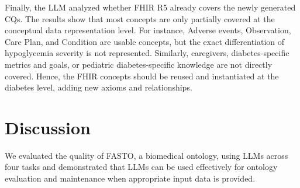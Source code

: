 \documentclass[
]{ceurart}
\begin{document}
Finally, the LLM analyzed whether FHIR R5 already covers the newly generated CQs. The results show that most concepts are only partially covered at the conceptual data representation level. For instance, Adverse events, Observation, Care Plan, and Condition are usable concepts, but the exact differentiation of hypoglycemia severity is not represented. Similarly, caregivers, diabetes-specific metrics and goals, or pediatric diabetes-specific knowledge are not directly covered. Hence, the FHIR concepts should be reused and instantiated at the diabetes level, adding new axioms and relationships. 


\section{Discussion}
\label{sec:dis}

We evaluated the quality of FASTO, a biomedical ontology, using LLMs across four tasks and demonstrated that LLMs can be used effectively for ontology evaluation and maintenance when appropriate input data is provided. 
\end{document}
